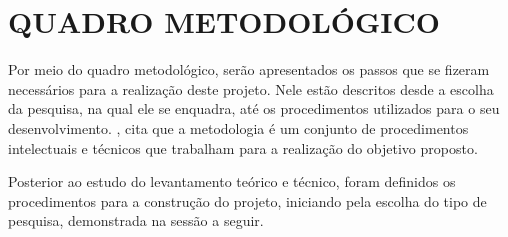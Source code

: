 
\chapter{QUADRO METODOLÓGICO}
\label{cap:quadroMetodologico}


\par Por meio do quadro metodológico, serão apresentados os passos que se fizeram necessários para a realização deste projeto. Nele estão descritos desde a escolha da pesquisa, na qual ele se enquadra, até os procedimentos utilizados para o seu desenvolvimento. , cita que a metodologia é um conjunto de procedimentos intelectuais e técnicos que trabalham para a realização do objetivo proposto.
\par Posterior ao estudo do levantamento teórico e técnico, foram definidos os procedimentos para a construção do projeto, iniciando pela escolha do tipo de pesquisa, demonstrada na sessão a seguir.







%



%

%



%

%